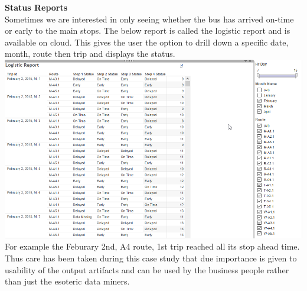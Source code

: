 \documentclass[12pt]{article}\usepackage[]{graphicx}\usepackage[]{color}
\begin{document}
\textbf{Status Reports}\\
Sometimes we are interested in only seeing  whether the bus has arrived on-time or early to the main stops. The below report is called the logistic report and is available on cloud. This gives the user the option to drill down a specific date, month, route then trip and displays the status.\\
\includegraphics[scale=0.5]{resources/tableau6}\\[1cm] 
For example the Feburary 2nd, A4 route, 1st trip reached all its stop ahead time.\\
Thus care has been taken during this case study that due importance is given to usability of the output artifacts and can be used by the business people rather than just the esoteric data miners.
\end{document}
